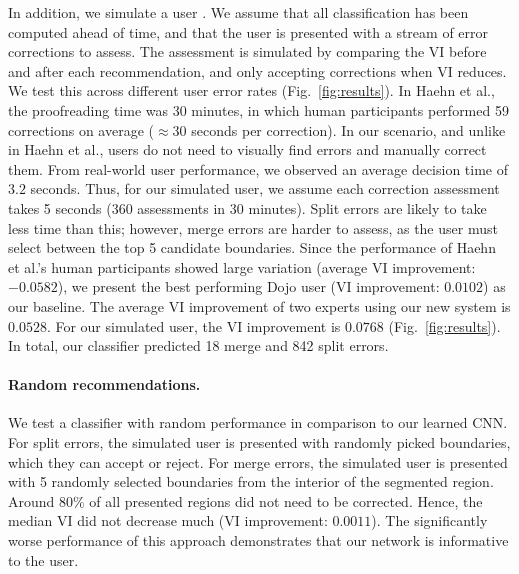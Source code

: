 In addition, we simulate a user . We assume that all classification has been computed ahead of time, and that the user is presented with a stream of error corrections to assess. The assessment is simulated by comparing the VI before and after each recommendation, and only accepting corrections when VI reduces. We test this across different user error rates (Fig.~\ref{fig:results}). In Haehn et al., the proofreading time was 30 minutes, in which human participants performed 59 corrections on average ($\approx30$ seconds per correction). In our scenario, and unlike in Haehn et al., users do not need to visually find errors and manually correct them. From real-world user performance, we observed an average decision time of $3.2$ seconds. Thus, for our simulated user, we assume each correction assessment takes 5 seconds (360 assessments in 30 minutes). Split errors are likely to take less time than this; however, merge errors are harder to assess, as the user must select between the top 5 candidate boundaries. Since the performance of Haehn et al.'s human participants showed large variation (average VI improvement: $-0.0582$), we present the best performing Dojo user (VI improvement: $0.0102$) as our baseline. The average VI improvement of two experts using our new system is $0.0528$. For our simulated user, the VI improvement is $0.0768$ (Fig.~\ref{fig:results}). In total, our classifier predicted 18 merge and 842 split errors.









\paragraph{Random recommendations.} We test a classifier with random performance in comparison to our learned CNN. For split errors, the simulated user is presented with randomly picked boundaries, which they can accept or reject. For merge errors, the simulated user is presented with 5 randomly selected boundaries from the interior of the segmented region. Around 80\% of all presented regions did not need to be corrected. Hence, the median VI did not decrease much (VI improvement: $0.0011$). The significantly worse performance of this approach demonstrates that our network is informative to the user.

